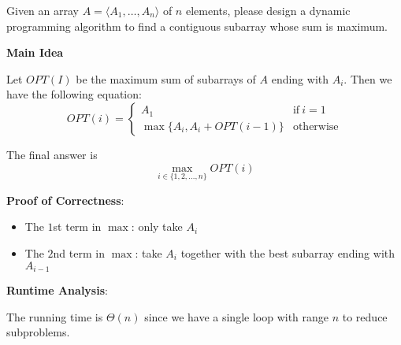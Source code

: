 

\vspace{0.1in}

Given an array $A=\langle A_1, \dots, A_n\rangle$ of $n$ elements, please design a dynamic programming algorithm to find a contiguous subarray whose sum is maximum.

\newcommand{\maxi}[2]{\max\left\{\substack{#1\\#2}\right\}}	%
\newcommand{\mini}[2]{\min\left\{\substack{#1\\#2}\right\}}	%
\newcommand{\case}[1]{\text{if}\ #1}	%
\newcommand{\otherwise}{\text{otherwise}}	%


\begin{solution}

    \textbf{Main Idea}
    
    Let $OPT(I)$ be the maximum sum of subarrays of $A$ ending with $A_i$. 
    Then we have the following equation:
    \[
    OPT(i)=
    \begin{cases}
        A_1                       & \case{i=1} \\
        \max \{A_i,A_i+OPT(i-1)\} & \otherwise
    \end{cases}
    \]

    The final answer is 
    \[ \max_{i\in\{1, 2, \dots, n\}} OPT(i) \]

    \textbf{Proof of Correctness}: 

    \begin{itemize}
        \item The $1$st term in $\max$: only take $A_i$
        \item The $2$nd term in $\max$: take $A_i$ together with the best subarray ending with $A_{i-1}$
    \end{itemize}

    \textbf{Runtime Analysis}: 

    The running time is $\Theta(n)$ since we have a single loop with range $n$ to reduce subproblems.
\end{solution}
